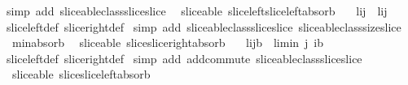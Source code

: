 \begin{isabellebody}
\ {\isacharparenleft}simp\ add{\isacharcolon}\ sliceable{\isacharunderscore}class{\isachardot}slice{\isacharunderscore}slice{\isacharparenright}%
\endisatagproof
{\isafoldproof}%
%
\isadelimproof
\isanewline
%
\endisadelimproof
\isanewline
{}\isamarkupfalse%
\ {\isacharparenleft}\ sliceable{\isacharparenright}\ slice{\isacharunderscore}left{\isacharunderscore}slice{\isacharunderscore}left{\isacharunderscore}absorb{\isacharcolon}\ \isanewline
\ \ {\isachardoublequoteopen}{\isacharparenleft}l{\isasymdagger}i{\isachardot}{\isachardot}{\isacharparenright}{\isasymdagger}j{\isachardot}{\isachardot}\ {\isacharequal}\ l{\isasymdagger}{\isacharparenleft}i{\isacharplus}j{\isacharparenright}{\isachardot}{\isachardot}{\isachardoublequoteclose}\isanewline
%
\isadelimproof
%
\endisadelimproof
%
\isatagproof
{}\isamarkupfalse%
\ slice{\isacharunderscore}left{\isacharunderscore}def\ slice{\isacharunderscore}right{\isacharunderscore}def\isanewline
{}\isamarkupfalse%
\ {\isacharparenleft}simp\ add{\isacharcolon}\ sliceable{\isacharunderscore}class{\isachardot}slice{\isacharunderscore}slice\ sliceable{\isacharunderscore}class{\isachardot}size{\isacharunderscore}slice\ \isanewline
\ \ min{\isacharunderscore}absorb{}{\isacharparenright}%
\endisatagproof
{\isafoldproof}%
%
\isadelimproof
\isanewline
%
\endisadelimproof
\isanewline
{}\isamarkupfalse%
\ {\isacharparenleft}\ sliceable{\isacharparenright}\ slice{\isacharunderscore}slice{\isacharunderscore}right{\isacharunderscore}absorb{\isacharcolon}\ \isanewline
\ \ {\isachardoublequoteopen}{\isacharparenleft}l{\isasymdagger}i{\isachardot}{\isachardot}j{\isacharparenright}{\isasymdagger}{\isachardot}{\isachardot}b\ {\isacharequal}\ l{\isasymdagger}i{\isachardot}{\isachardot}{\isacharparenleft}min\ j\ {\isacharparenleft}i{\isacharplus}b{\isacharparenright}{\isacharparenright}{\isachardoublequoteclose}\isanewline
%
\isadelimproof
%
\endisadelimproof
%
\isatagproof
{}\isamarkupfalse%
\ slice{\isacharunderscore}left{\isacharunderscore}def\ slice{\isacharunderscore}right{\isacharunderscore}def\isanewline
{}\isamarkupfalse%
\ {\isacharparenleft}simp\ add{\isacharcolon}\ add{\isachardot}commute\ sliceable{\isacharunderscore}class{\isachardot}slice{\isacharunderscore}slice{\isacharparenright}%
\endisatagproof
{\isafoldproof}%
%
\isadelimproof
\isanewline
%
\endisadelimproof
\isanewline
{}\isamarkupfalse%
\ {\isacharparenleft}\ sliceable{\isacharparenright}\ slice{\isacharunderscore}slice{\isacharunderscore}left{\isacharunderscore}absorb{\isacharcolon}\ \isanewline

\end{isabellebody}
